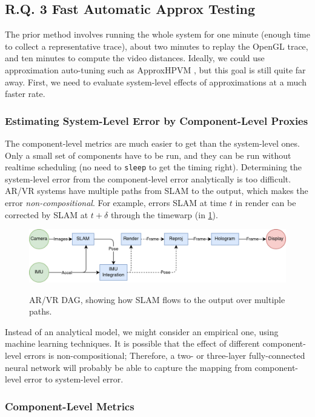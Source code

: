 \subsection{R.Q. 3 Fast Automatic Approx Testing}

The prior method involves running the whole system for one minute (enough time to collect a representative trace), about two minutes to replay the OpenGL trace, and ten minutes to compute the video distances.
Ideally, we could use approximation auto-tuning such as ApproxHPVM \cite{approxhpvm}, but this goal is still quite far away. First, we need to evaluate system-level effects of approximations at a much faster rate.

\subsubsection{Estimating System-Level Error by Component-Level Proxies}

The component-level metrics are much easier to get than the system-level ones.
Only a small set of components have to be run, and they can be run without realtime scheduling (no need to \verb+sleep+ to get the timing right).
Determining the system-level error from the component-level error analytically is too difficult.
AR/VR systems have multiple paths from SLAM to the output, which makes the error \textit{non-compositional}.
For example, errors SLAM at time \(t\) in render can be corrected by SLAM at \(t+\delta\) through the timewarp (in \cref{dag}).

\begin{figure}
\caption{AR/VR DAG, showing how SLAM flows to the output over multiple paths.}
\includegraphics[width=\columnwidth]{dag.png}
\label{dag}
\end{figure}

Instead of an analytical model, we might consider an empirical one, using machine learning techniques.
It is possible that the effect of different component-level errors is non-compositional;
Therefore, a two- or three-layer fully-connected neural network will probably be able to capture the mapping from component-level error to system-level error.

\subsubsection{Component-Level Metrics}

